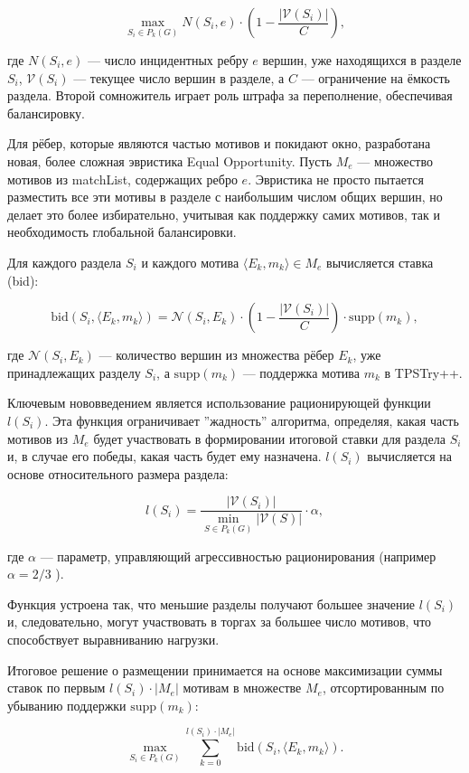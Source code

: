 $$
\max_{S_i\in P_k(G)} N(S_i, e) \cdot \left(1 - \frac{|\mathcal{V}(S_i)|}{C}\right),
$$

где $N(S_i, e)$ --- число инцидентных ребру $e$ вершин, уже находящихся в разделе $S_i$, $\mathcal{V}(S_i)$ --- текущее число вершин в разделе, а $C$ --- ограничение на ёмкость раздела. Второй сомножитель играет роль
штрафа за переполнение, обеспечивая балансировку.

Для рёбер, которые являются частью мотивов и покидают окно, разработана новая, более сложная эвристика Equal Opportunity. Пусть $M_e$ --- множество мотивов из matchList, содержащих ребро $e$. Эвристика не просто
пытается разместить все эти мотивы в разделе с наибольшим числом общих вершин, но делает это более избирательно, учитывая как поддержку самих мотивов, так и необходимость глобальной балансировки.

Для каждого раздела $S_i$ и каждого мотива $\langle E_k, m_k \rangle \in M_e$
вычисляется ставка (bid):

$$
\text{bid}(S_i,\langle E_k,m_k\rangle) = \mathcal{N}(S_i,E_k)\cdot
\left(1 - \frac{|\mathcal{V}(S_i)|}{C}\right)\cdot \text{supp}(m_k),
$$

где $\mathcal{N}(S_i,E_k)$ --- количество вершин из множества рёбер $E_k$,
уже принадлежащих разделу $S_i$, а $\text{supp}(m_k)$ --- поддержка мотива
$m_k$ в TPSTry++.

Ключевым нововведением является использование рационирующей функции $l(S_i)$. Эта функция ограничивает ''жадность'' алгоритма, определяя, какая часть мотивов из $M_e$ будет участвовать в формировании итоговой ставки для раздела $S_i$ и, в случае его победы, какая часть будет ему назначена. $l(S_i)$ вычисляется на основе относительного размера раздела:

$$
l(S_i) = \frac{|\mathcal{V}(S_i)|}{\min_{S \in P_k(G)} |\mathcal{V}(S)|} \cdot \alpha,
$$

где $\alpha$ --- параметр, управляющий агрессивностью рационирования (например $\alpha = 2/3$ \cite{loom}). 

Функция устроена так, что меньшие разделы получают большее значение $l(S_i)$ и, следовательно, могут участвовать в торгах за большее число мотивов, что способствует выравниванию нагрузки.

Итоговое решение о размещении принимается на основе максимизации суммы ставок по первым $l(S_i) \cdot |M_e|$ мотивам в множестве $M_e$, отсортированным по убыванию поддержки $\text{supp}(m_k)$:

$$
\max_{S_i\in P_k(G)} \sum_{k = 0}^{l(S_i)\cdot |M_e|} \text{bid}(S_i,\langle E_k,m_k\rangle).
$$


